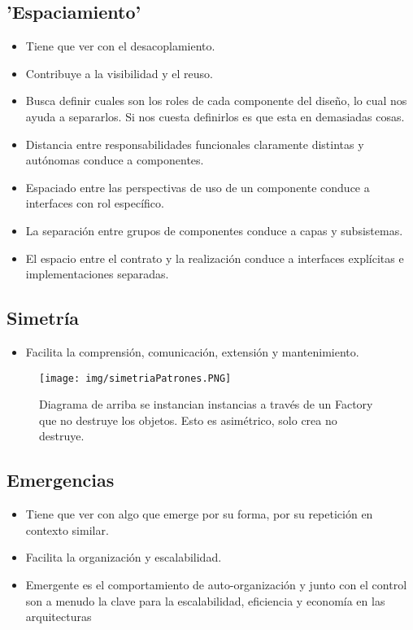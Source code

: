 \subsection*{'Espaciamiento'}
\begin{itemize}
\item Tiene que ver con el desacoplamiento.
\item Contribuye a la visibilidad y el reuso.
\item Busca definir cuales son los roles de cada componente del diseño, lo cual nos ayuda a separarlos. Si nos cuesta definirlos es que esta en demasiadas cosas.
\item Distancia entre responsabilidades funcionales claramente distintas y autónomas conduce a componentes.
\item  Espaciado entre las perspectivas de uso de un componente conduce a interfaces con rol específico.
\item La separación entre grupos de componentes conduce a capas y subsistemas.
\item El espacio entre el contrato y la realización conduce a interfaces explícitas e implementaciones separadas.
\end{itemize}



\subsection*{Simetría}

\begin{itemize}
\item Facilita la comprensión, comunicación, extensión y mantenimiento.
\end{itemize}

\begin{figure}[!htb]
    \centering
    \texttt{[image: img/simetriaPatrones.PNG]}
    \caption{Diagrama de arriba se instancian instancias a través de un Factory que no destruye los objetos. Esto es asimétrico, solo crea no destruye.}
\end{figure}



\subsection*{Emergencias}
\begin{itemize}
\item Tiene que ver con algo que emerge por su forma, por su repetición en contexto similar.
\item Facilita la organización y escalabilidad.
\item Emergente es el comportamiento de auto-organización y junto con el control son a menudo la clave para la escalabilidad, eficiencia y economía en las arquitecturas
\end{itemize}


